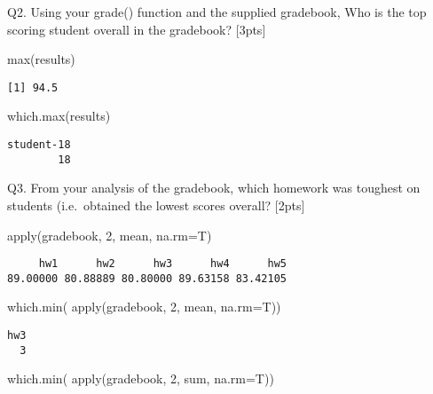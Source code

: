 \documentclass[
  letterpaper,
  DIV=11,
  numbers=noendperiod]{scrartcl}
\newenvironment{Shaded}{\begin{snugshade}}{\end{snugshade}}
\newcommand{\AttributeTok}[1]{\textcolor[rgb]{0.40,0.45,0.13}{#1}}
\newcommand{\DecValTok}[1]{\textcolor[rgb]{0.68,0.00,0.00}{#1}}
\newcommand{\FunctionTok}[1]{\textcolor[rgb]{0.28,0.35,0.67}{#1}}
\newcommand{\NormalTok}[1]{\textcolor[rgb]{0.00,0.23,0.31}{#1}}
\begin{document}
Q2. Using your grade() function and the supplied gradebook, Who is the
top scoring student overall in the gradebook? {[}3pts{]}

\begin{Shaded}
\begin{Highlighting}[]
\FunctionTok{max}\NormalTok{(results)}
\end{Highlighting}
\end{Shaded}

\begin{verbatim}
[1] 94.5
\end{verbatim}

\begin{Shaded}
\begin{Highlighting}[]
\FunctionTok{which.max}\NormalTok{(results)}
\end{Highlighting}
\end{Shaded}

\begin{verbatim}
student-18 
        18 
\end{verbatim}

Q3. From your analysis of the gradebook, which homework was toughest on
students (i.e.~obtained the lowest scores overall? {[}2pts{]}

\begin{Shaded}
\begin{Highlighting}[]
\FunctionTok{apply}\NormalTok{(gradebook, }\DecValTok{2}\NormalTok{, mean, }\AttributeTok{na.rm=}\NormalTok{T)}
\end{Highlighting}
\end{Shaded}

\begin{verbatim}
     hw1      hw2      hw3      hw4      hw5 
89.00000 80.88889 80.80000 89.63158 83.42105 
\end{verbatim}

\begin{Shaded}
\begin{Highlighting}[]
\FunctionTok{which.min}\NormalTok{( }\FunctionTok{apply}\NormalTok{(gradebook, }\DecValTok{2}\NormalTok{, mean, }\AttributeTok{na.rm=}\NormalTok{T))}
\end{Highlighting}
\end{Shaded}

\begin{verbatim}
hw3 
  3 
\end{verbatim}

\begin{Shaded}
\begin{Highlighting}[]
\FunctionTok{which.min}\NormalTok{( }\FunctionTok{apply}\NormalTok{(gradebook, }\DecValTok{2}\NormalTok{, sum, }\AttributeTok{na.rm=}\NormalTok{T))}
\end{Highlighting}
\end{Shaded}
\end{document}
